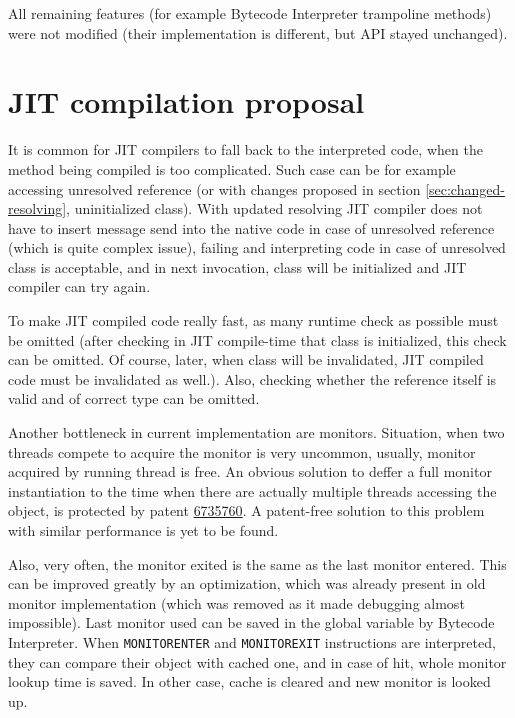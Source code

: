 \documentclass[11pt,twoside,a4paper]{book}
\begin{document}
All remaining features (for example Bytecode Interpreter trampoline methods) were not modified (their implementation is different, but API stayed unchanged). 

\section{JIT compilation proposal}

It is common for JIT compilers to fall back to the interpreted code, when the method being compiled is too complicated.
Such case can be for example accessing unresolved reference (or with changes proposed in section \ref{sec:changed-resolving}, uninitialized class).
With updated resolving JIT compiler does not have to insert message send into the native code in case of unresolved reference (which is quite complex issue), failing and interpreting code in case of unresolved class is acceptable, and in next invocation, class will be initialized and JIT compiler can try again.

To make JIT compiled code really fast, as many runtime check as possible must be omitted (after checking in JIT compile-time that class is initialized, this check can be omitted. Of course, later, when class will be invalidated, JIT compiled code must be invalidated as well.). 
Also, checking whether the reference itself is valid and of correct type can be omitted.

Another bottleneck in current implementation are monitors.
Situation, when two threads compete to acquire the monitor is very uncommon, usually, monitor acquired by running thread is free.
An obvious solution to deffer a full monitor instantiation to the time when there are actually multiple threads accessing the object, is protected by patent \href{http://www.google.com/patents/US6735760}{6735760}.
A patent-free solution to this problem with similar performance is yet to be found.

Also, very often, the monitor exited is the same as the last monitor entered.
This can be improved greatly by an optimization, which was already present in old monitor implementation (which was removed as it made debugging almost impossible).
Last monitor used can be saved in the global variable by Bytecode Interpreter. 
When \texttt{MONITORENTER} and \texttt{MONITOREXIT} instructions are interpreted, they can compare their object with cached one, and in case of hit, whole monitor lookup time is saved.
In other case, cache is cleared and new monitor is looked up.
\end{document}
